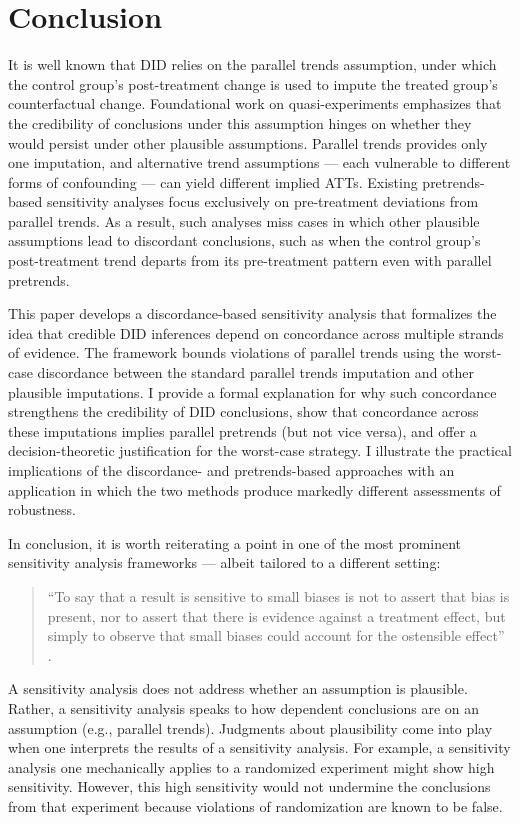\documentclass[twoside,11pt]{article}
\begin{document}
\section{Conclusion} \label{sec: conclusion}

It is well known that DID relies on the parallel trends assumption, under which the control group's post-treatment change is used to impute the treated group's counterfactual change. Foundational work on quasi-experiments emphasizes that the credibility of conclusions under this assumption hinges on whether they would persist under other plausible assumptions. Parallel trends provides only one imputation, and alternative trend assumptions --- each vulnerable to different forms of confounding --- can yield different implied \textrm{ATT}s. Existing pretrends-based sensitivity analyses focus exclusively on pre-treatment deviations from parallel trends. As a result, such analyses miss cases in which other plausible assumptions lead to discordant conclusions, such as when the control group's post-treatment trend departs from its pre-treatment pattern even with parallel pretrends.

This paper develops a discordance-based sensitivity analysis that formalizes the idea that credible DID inferences depend on concordance across multiple strands of evidence. The framework bounds violations of parallel trends using the worst-case discordance between the standard parallel trends imputation and other plausible imputations. I provide a formal explanation for why such concordance strengthens the credibility of DID conclusions, show that concordance across these imputations implies parallel pretrends (but not vice versa), and offer a decision-theoretic justification for the worst-case strategy. I illustrate the practical implications of the discordance- and pretrends-based approaches with an application in which the two methods produce markedly different assessments of robustness.

In conclusion, it is worth reiterating a point in one of the most prominent sensitivity analysis frameworks --- albeit tailored to a different setting:
\begin{quote}
``To say that a result is sensitive to small biases is not to assert that bias is present, nor to assert that there is evidence against a treatment effect, but simply to observe that small biases could account for the ostensible effect'' \citep[][p.~497]{rosenbaumkrieger1990}.
\end{quote}
A sensitivity analysis does not address whether an assumption is plausible. Rather, a sensitivity analysis speaks to how dependent conclusions are on an assumption (e.g., parallel trends). Judgments about plausibility come into play when one interprets the results of a sensitivity analysis. For example, a sensitivity analysis one mechanically applies to a randomized experiment might show high sensitivity. However, this high sensitivity would not undermine the conclusions from that experiment because violations of randomization are known to be false. 
\end{document}
